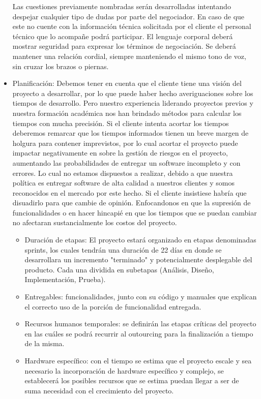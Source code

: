 \begin{itemize}
Las cuestiones previamente nombradas serán desarrolladas intentando despejar cualquier tipo de dudas por parte del negociador.
En caso de que este no cuente con la información técnica solicitada por el cliente el personal técnico que lo acompañe podrá participar.
El lenguaje corporal deberá mostrar seguridad para expresar los términos de negociación. 
Se deberá mantener una relación cordial, siempre manteniendo el mismo tono de voz, sin cruzar los brazos o piernas.

	\item Planificación: Debemos tener en cuenta que el cliente tiene una visión del proyecto a desarrollar, por lo que puede haber hecho averiguaciones sobre los tiempos de desarrollo.
Pero nuestro experiencia liderando proyectos previos y nuestra formación académica nos han brindado métodos para calcular los tiempos con mucha precisión.
Si el cliente intenta acortar los tiempos deberemos remarcar que los tiempos informados tienen un breve margen de holgura para contener imprevistos, por lo cual acortar el proyecto puede impactar negativamente en sobre la gestión de riesgos en el proyecto, aumentando las probabilidades de entregar un software incompleto y con errores.
Lo cual no estamos dispuestos a realizar, debido a que nuestra política es entregar software de alta calidad a nuestros clientes y somos reconocidos en el mercado por este hecho.
Si el cliente insistiese habría que disuadirlo para que cambie de opinión.
Enfocandonos en que la supresión de funcionalidades o en hacer hincapié en que los tiempos que se puedan cambiar no afectaran sustancialmente los costos del proyecto.
	\begin{itemize}
		\item Duración de etapas: El proyecto estará organizado en etapas denominadas sprints, los cuales tendrán una duración de 22 días en donde se desarrollara un incremento "terminado" y potencialmente desplegable del producto. Cada una dividida en subetapas (Análisis, Diseño, Implementación, Prueba).
        \item Entregables: funcionalidades, junto con su código y manuales que explican el correcto uso de la porción de funcionalidad entregada.
        \item Recursos humanos temporales: se definirán las etapas críticas del proyecto en las cuáles se podrá recurrir al outourcing para la finalización a tiempo de la misma.
        \item Hardware específico: con el tiempo se estima que el proyecto escale y sea necesario la incorporación de hardware específico y complejo, se establecerá los posibles recursos que se estima puedan llegar a ser de suma necesidad con el crecimiento del proyecto.
	\end{itemize}
    

\end{itemize}

